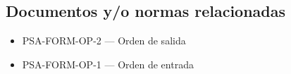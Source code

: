 
\subsection{Documentos y/o normas relacionadas}

\begin{itemize}
	\item PSA-FORM-OP-2 --- Orden de salida
	\item PSA-FORM-OP-1 --- Orden de entrada
\end{itemize}

